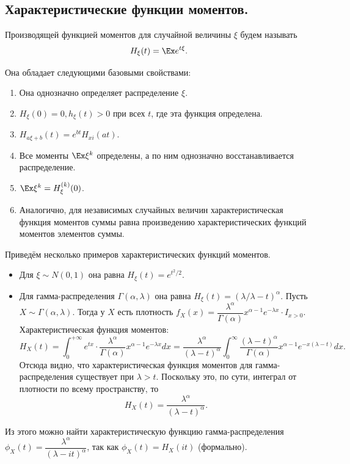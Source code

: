 \subsection{Характеристические функции моментов.}
\begin{definition}
    Производящей функцией моментов для случайной величины $\xi$ будем называть
    \[
        H_{\xi}(t) = \Ex e^{t\xi}.
    \]
\end{definition}
Она обладает следующими базовыми свойствами:
\begin{enumerate}
    \item Она однозначно определяет распределение $\xi$.
    \item $H_{\xi}(0) = 0, h_{\xi}(t) > 0$ при всех $t$, где эта функция определена.
    \item $H_{a\xi + b}(t) = e^{bt}H_{xi}(at)$.
    \item Все моменты $\Ex \xi^k$ определены, а по ним однозначно восстанавливается распределение.
    \item $\Ex \xi^k = H^{(k)}_\xi(0)$.
    \item Аналогично, для независимых случайных величин характеристическая функция моментов суммы равна произведению характеристических функций моментов элементов суммы.
\end{enumerate}
\begin{example}
    Приведём несколько примеров характеристических функций моментов.
    \begin{itemize}
        \item Для $\xi \sim N(0, 1)$ она равна $H_\xi(t) = e^{t^2/2}$.
        \item Для гамма-распределения $\Gamma(\alpha, \lambda)$ она равна $H_{\xi}(t) = (\lambda/\lambda - t)^\alpha$.
        Пусть $X \sim \Gamma(\alpha, \lambda)$. Тогда у $X$ есть плотность $f_X (x) = \dfrac{\lambda^\alpha}{\Gamma(\alpha)}x^{\alpha - 1}e^{-\lambda x} \cdot I_{x > 0}$.
        Характеристическая функция моментов:
        \[
            H_X(t) = \int_0^{+\infty} e^{tx} \cdot \dfrac{\lambda^\alpha}{\Gamma(\alpha)} x^{\alpha - 1}e^{-\lambda x} dx = \dfrac{\lambda^\alpha}{(\lambda - t)^\alpha} \int_0^{\infty} \dfrac{(\lambda - t)^\alpha}{\Gamma(\alpha)}x^{\alpha - 1} e^{-x(\lambda - t)}dx.
        \]
        Отсюда видно, что характеристическая функция моментов для гамма-распределения существует при $\lambda > t$.
        Поскольку это, по сути, интеграл от плотности по всему пространству, то
        \[
            H_X(t) = \dfrac{\lambda^\alpha}{(\lambda - t)^\alpha}.
        \]
    \end{itemize}
    \begin{note}
        Из этого можно найти характеристическую функцию гамма-распределения $\phi_X(t) = \dfrac{\lambda^\alpha}{(\lambda - it)^\alpha}$, так как $\phi_X(t) = H_X(it)$ (формально).
    \end{note}
\end{example}
